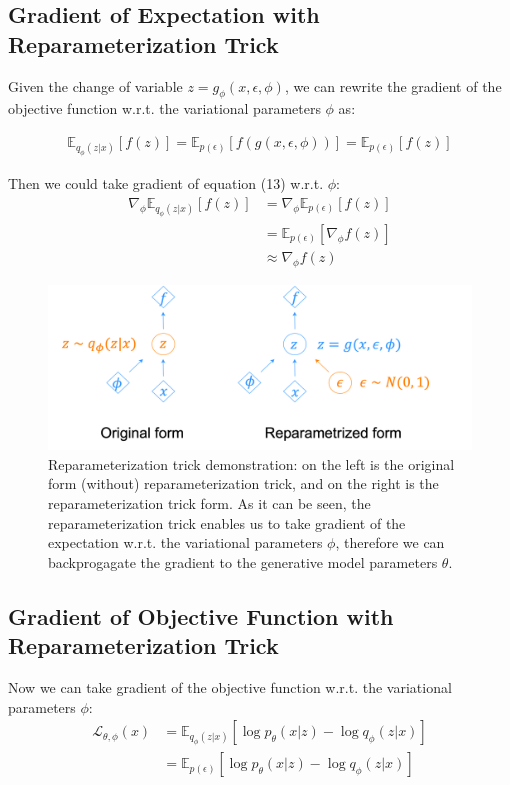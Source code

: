 \documentclass[11pt]{article}
\theoremstyle{definition}
\begin{document}
\subsection{Gradient of Expectation with Reparameterization Trick}

Given the change of variable $z=g_\phi(x, \epsilon, \phi)$, we can rewrite the gradient of the objective function w.r.t. the variational parameters $\phi$ as:

\begin{align}
    \mathbb{E}_{q_\phi(z|x)}[f(z)] = \mathbb{E}_{p(\epsilon)}[f(g(x, \epsilon, \phi))] = \mathbb{E}_{p(\epsilon)}[f(z)]
\end{align}

Then we could take gradient of equation (13) w.r.t. $\phi$:
\begin{align}
    \nabla_\phi \mathbb{E}_{q_\phi(z|x)}[f(z)] &= \nabla_\phi \mathbb{E}_{p(\epsilon)}[f(z)]\\
    &= \mathbb{E}_{p(\epsilon)}[\nabla_\phi f(z)]\\
    &\approx \nabla_\phi f(z)
\end{align}

\begin{figure}[h]
\includegraphics*[width=\textwidth]{reparam.png}
\caption{Reparameterization trick demonstration: on the left is the original form (without) reparameterization trick, and on the right is the reparameterization trick form. As it can be seen, the reparameterization trick enables us to take gradient of the expectation w.r.t. the variational parameters $\phi$, therefore we can backprogagate the gradient to the generative model parameters $\theta$.}
\end{figure}

\subsection{Gradient of Objective Function with Reparameterization Trick}

Now we can take gradient of the objective function w.r.t. the variational parameters $\phi$:
\begin{align}
    \mathcal{L}_{\theta, \phi}(x) &= \mathbb{E}_{q_\phi(z|x)}[\log p_\theta(x|z) - \log q_\phi(z|x)]\\
    &= \mathbb{E}_{p(\epsilon)}[\log p_\theta(x|z) - \log q_\phi(z|x)]
\end{align}
\end{document}
